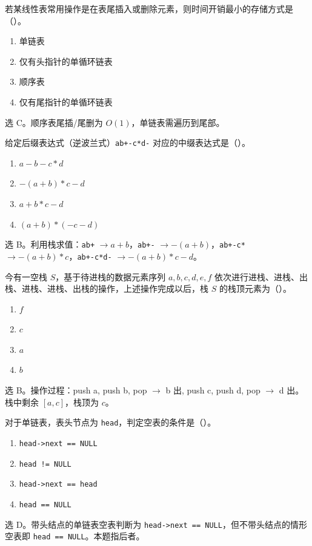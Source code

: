 \begin{question}
若某线性表常用操作是在表尾插入或删除元素，则时间开销最小的存储方式是（\quad）。
\begin{enumerate}
  \item 单链表
  \item 仅有头指针的单循环链表
  \item 顺序表
  \item 仅有尾指针的单循环链表
\end{enumerate}
\begin{solution}
选 C。顺序表尾插/尾删为 $O(1)$，单链表需遍历到尾部。
\end{solution}
\end{question}

\begin{question}
给定后缀表达式（逆波兰式）\texttt{ab+-c*d-} 对应的中缀表达式是（\quad）。
\begin{enumerate}
  \item $a-b-c*d$
  \item $-(a+b)*c-d$
  \item $a+b*c-d$
  \item $(a+b)*(-c-d)$
\end{enumerate}
\begin{solution}
选 B。利用栈求值：\texttt{ab+} $\to a+b$，\texttt{ab+-} $\to -(a+b)$，\texttt{ab+-c*} $\to -(a+b)*c$，\texttt{ab+-c*d-} $\to -(a+b)*c-d$。
\end{solution}
\end{question}

\begin{question}
今有一空栈 $S$，基于待进栈的数据元素序列 $a,b,c,d,e,f$ 依次进行进栈、进栈、出栈、进栈、进栈、出栈的操作，上述操作完成以后，栈 $S$ 的栈顶元素为（\quad）。
\begin{enumerate}
  \item $f$
  \item $c$
  \item $a$
  \item $b$
\end{enumerate}
\begin{solution}
选 B。操作过程：push a, push b, pop $\to$ b 出, push c, push d, pop $\to$ d 出。栈中剩余 $[a,c]$，栈顶为 $c$。
\end{solution}
\end{question}

\begin{question}
对于单链表，表头节点为 \texttt{head}，判定空表的条件是（\quad）。
\begin{enumerate}
  \item \texttt{head->next == NULL}
  \item \texttt{head != NULL}
  \item \texttt{head->next == head}
  \item \texttt{head == NULL}
\end{enumerate}
\begin{solution}
选 D。带头结点的单链表空表判断为 \texttt{head->next == NULL}，但不带头结点的情形空表即 \texttt{head == NULL}。本题指后者。
\end{solution}
\end{question}

